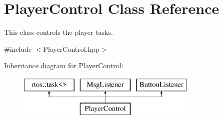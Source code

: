 \hypertarget{class_player_control}{}\section{Player\+Control Class Reference}
\label{class_player_control}


This class controls the player tasks.  




{\ttfamily \#include $<$Player\+Control.\+hpp$>$}

Inheritance diagram for Player\+Control\+:\begin{figure}[H]
\begin{center}
\leavevmode
\includegraphics[height=2.000000cm]{class_player_control}
\end{center}
\end{figure}
